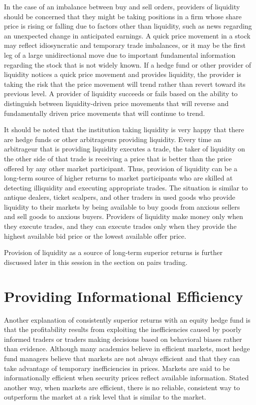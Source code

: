 \documentclass[11pt]{article}
\begin{document}
In the case of an imbalance between buy and sell orders, providers of liquidity should be concerned that they might be taking positions in a firm whose share price is rising or falling due to factors other than liquidity, such as news regarding an unexpected change in anticipated earnings. A quick price movement in a stock may reflect idiosyncratic and temporary trade imbalances, or it may be the first leg of a large unidirectional move due to important fundamental information regarding the stock that is not widely known. If a hedge fund or other provider of liquidity notices a quick price movement and provides liquidity, the provider is taking the risk that the price movement will trend rather than revert toward its previous level. A provider of liquidity succeeds or fails based on the ability to distinguish between liquidity-driven price movements that will reverse and fundamentally driven price movements that will continue to trend.

It should be noted that the institution taking liquidity is very happy that there are hedge funds or other arbitrageurs providing liquidity. Every time an arbitrageur that is providing liquidity executes a trade, the taker of liquidity on the other side of that trade is receiving a price that is better than the price offered by any other market participant. Thus, provision of liquidity can be a long-term source of higher returns to market participants who are skilled at detecting illiquidity and executing appropriate trades. The situation is similar to antique dealers, ticket scalpers, and other traders in used goods who provide liquidity to their markets by being available to buy goods from anxious sellers and sell goods to anxious buyers. Providers of liquidity make money only when they execute trades, and they can execute trades only when they provide the highest available bid price or the lowest available offer price.

Provision of liquidity as a source of long-term superior returns is further discussed later in this session in the section on pairs trading.

\section*{Providing Informational Efficiency}
Another explanation of consistently superior returns with an equity hedge fund is that the profitability results from exploiting the inefficiencies caused by poorly informed traders or traders making decisions based on behavioral biases rather than evidence. Although many academics believe in efficient markets, most hedge fund managers believe that markets are not always efficient and that they can take advantage of temporary inefficiencies in prices. Markets are said to be informationally efficient when security prices reflect available information. Stated another way, when markets are efficient, there is no reliable, consistent way to outperform the market at a risk level that is similar to the market.
\end{document}
